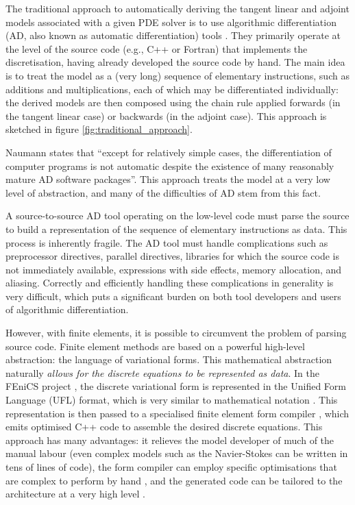\documentclass{siamltex}
\begin{document}
The traditional approach to automatically deriving the tangent linear and adjoint models associated with a given
PDE solver is to use algorithmic differentiation (AD, also known as automatic differentiation) tools  \cite{griewank2008,naumann2011}.
They primarily operate at the level of the source code (e.g., C++ or Fortran) that implements the discretisation, having already developed the
source code by hand. The main idea
is to treat the model as a (very long) sequence of elementary instructions, such as additions and multiplications, each of
which may be differentiated individually: the derived models are then composed using the chain rule applied forwards (in the
tangent linear case) or backwards (in the adjoint case). This approach is sketched in figure \ref{fig:traditional_approach}.

Naumann \cite{naumann2011} states that ``except for relatively simple cases, the differentiation
of computer programs is not automatic despite the existence of many reasonably mature AD software packages''.
This approach treats the model at a very low level of abstraction, and many of the difficulties of AD
stem from this fact. 

A source-to-source AD tool operating on the low-level code must parse the source to build a
representation of the sequence of elementary instructions as data.
This process is inherently fragile. The AD tool must handle complications such as preprocessor directives,
parallel directives, libraries for which the source code is not immediately available, expressions with
side effects, memory allocation, and aliasing. Correctly and efficiently handling these complications in
generality is very difficult, which puts a significant burden on both tool developers and users of algorithmic
differentiation.

However, with finite elements, it is possible to circumvent the problem of parsing source code. Finite element methods
are based on a powerful high-level abstraction: the language of variational forms. 
This mathematical abstraction naturally \emph{allows for the discrete
equations to be represented as data}. In the FEniCS project
\cite{logg2011}, the discrete variational form is represented in the Unified Form
Language (UFL) format, which is very similar to mathematical notation \cite{alnaes2011,alnaes2012}. This representation is then passed to a specialised finite element
form compiler \cite{kirby2006}, which emits optimised C++ code to assemble the desired discrete equations.
This approach has many advantages: it relieves the model developer of much of the manual labour (even complex
models such as the Navier-Stokes can be written in tens of lines of code), the form compiler can employ
specific optimisations that are complex to perform by hand \cite{olgaard2010}, and the generated code
can be tailored to the architecture at a very high level \cite{markall2012}.
\end{document}
